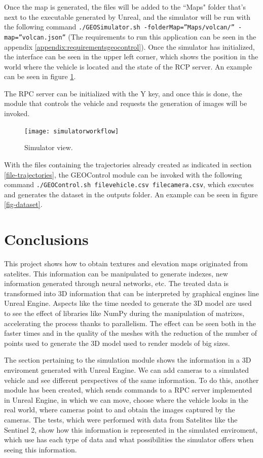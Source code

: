 \documentclass[10pt,a4paper,twocolumn,twoside]{article}
\begin{document}
Once the map is generated, the files will be added to the ``Maps" folder that's next to the executable generated by Unreal, and the simulator will be run with the following command {\tt ./GEOSimulator.sh -folderMap=''Maps/volcan/'' -map=''volcan.json''} (The requirements to run this application can be seen in the appendix \ref{appendix:requirementsgeocontrol}). Once the simulator has initialized, the interface can be seen in the upper left corner, which shows the position in the world where the vehicle is located and the state of the RCP server. An example can be seen in figure \ref{fig-workflowsimulator}.

The RPC server can be initialized with the Y key, and once this is done, the module that controls the vehicle and requests the generation of images will be invoked.

\begin{figure}[!h]
\centering
  	\texttt{[image: simulatorworkflow]}
	\caption{Simulator view.}
	\label{fig-workflowsimulator}
\end{figure}

With the files containing the trajectories already created as indicated in section \ref{file-trajectories}, the GEOControl module can be invoked with the following command {\tt ./GEOControl.sh filevehicle.csv filecamera.csv}, which executes and generates the dataset in the outputs folder. An example can be seen in figure \ref{fig-dataset}.

\section{Conclusions}

This project shows how to obtain textures and elevation maps originated from satelites. This information can be manipulated to generate indexes, new information generated through neural networks, etc. The treated data is transformed into 3D information that can be interpreted by graphical engines line Unreal Engine. Aspects like the time needed to generate the 3D model are used to see the effect of libraries like NumPy during the manipulation of matrixes, accelerating the process thanks to parallelism. The effect can be seen both in the faster times and in the quality of the meshes with the reduction of the number of points used to generate the 3D model used to render models of big sizes.

The section pertaining to the simulation module shows the information in a 3D enviroment generated with Unreal Engine. We can add cameras to a simulated vehicle and see different perspectives of the same information. To do this, another module has been created, which sends commands to a RPC server implemented in Unreal Engine, in which we can move, choose where the vehicle looks in the real world, where cameras point to and obtain the images captured by the cameras.
The tests, which were performed with data from Satelites like the Sentinel 2, show how this information is represented in the simulated enviroment, which use has each type of data and what possibilities the simulator offers when seeing this information.
\end{document}
